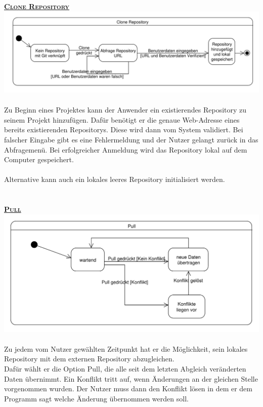 \documentclass[a4paper]{article}
\begin{document}
\newpage	
\underline{\textbf{\textsc{\hypertarget{target}{Clone Repository}}}} \\
\includegraphics[width=\textwidth]{Clone.pdf}\\\\
Zu Beginn eines Projektes kann der Anwender ein existierendes Repository zu seinem Projekt hinzufügen.
Dafür benötigt er die genaue Web-Adresse eines bereits existierenden Repositorys. Diese wird dann vom System validiert. Bei falscher Eingabe gibt es eine Fehlermeldung und der Nutzer gelangt zurück in das Abfragemenü.
Bei erfolgreicher Anmeldung wird das Repository lokal auf dem Computer gespeichert. \\\\
Alternative kann auch ein lokales leeres Repository initialisiert werden.\\\\\\
\underline{\textbf{\textsc{Pull}}}\\
\includegraphics[width=\textwidth]{Pull.pdf}\\\\
Zu jedem vom Nutzer gewählten Zeitpunkt hat er die Möglichkeit, sein lokales Repository mit dem externen Repository abzugleichen. \\
Dafür wählt er die Option Pull, die alle seit dem letzten Abgleich veränderten Daten übernimmt.
Ein Konflikt tritt auf, wenn Änderungen an der gleichen Stelle vorgenommen wurden.
Der Nutzer muss dann den Konflikt lösen in dem er dem Programm sagt welche Änderung übernommen werden soll.
\end{document}

